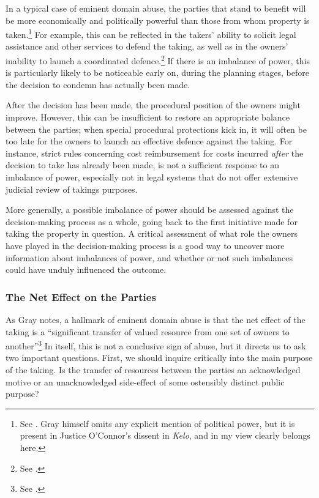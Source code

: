 In a typical case of eminent domain abuse, the parties that stand to benefit will be more economically and politically powerful than those from whom property is taken.\footnote{See \cite[30-31]{gray11}. Gray himself omits any explicit mention of political power, but it is present in Justice O'Connor's dissent in {\it Kelo}, and in my view clearly belongs here.} For example, this can be reflected in the takers' ability to solicit legal assistance and other services to defend the taking, as well as in the  owners' inability to launch a coordinated defence.\footnote{See \cite[30-31]{gray11}.} If there is an imbalance of power, this is particularly likely to be noticeable early on, during the planning stages, before the decision to condemn has actually been made. 

After the decision has been made, the procedural position of the owners might improve. However, this can be insufficient to restore an appropriate balance between the parties; when special procedural protections kick in, it will often be too late for the owners to launch an effective defence against the taking. For instance, strict rules concerning cost reimbursement for costs incurred {\it after} the decision to take has already been made, is not a sufficient response to an imbalance of power, especially not in legal systems that do not offer extensive judicial review of takings purposes.

More generally, a possible imbalance of power should be assessed against the decision-making process as a whole, going back to the first initiative made for taking the property in question. A critical  assessment of what role the owners have played in the decision-making process is a good way to uncover more information about imbalances of power, and whether or not such imbalances could have unduly influenced the outcome.

\subsubsection*{The Net Effect on the Parties}

As Gray notes, a hallmark of eminent domain abuse is that the net effect of the taking is a ``significant transfer of valued resource from one set of owners to another''\footnote{See \cite[31]{gray11}.} In itself, this is not a conclusive sign of abuse, but it directs us to ask two important questions. First, we should inquire critically into the main purpose of the taking. Is the transfer of resources between the parties an acknowledged motive or an unacknowledged side-effect of some ostensibly distinct public purpose?

